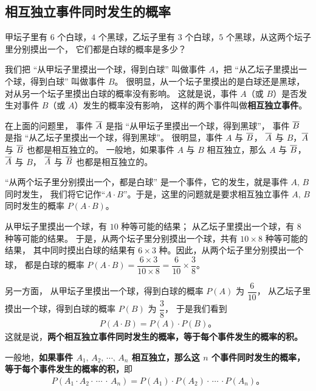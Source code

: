 \subsection{相互独立事件同时发生的概率}\label{subsec:3-4}

甲坛子里有 $6$ 个白球，$4$ 个黑球，乙坛子里有 $3$ 个白球，$5$ 个黑球，从这两个坛子里分别摸出一个，
它们都是白球的概率是多少？

我们把 “从甲坛子里摸出一个球，得到白球” 叫做事件 $A$，把 “从乙坛子里摸出一个球，得到白球” 叫做事件 $B$。
很明显，从一个坛子里摸出的是白球还是黑球，对从另一个坛子里摸出白球的概率没有影响。
这就是说，事件 $A$（或 $B$）是否发生对事件 $B$（或 $A$）发生的概率没有影响，
这样的两个事件叫做\textbf{相互独立事件}。

在上面的问题里，
事件 $\overline{A}$ 是指 “从甲坛子里摸出一个球，得到黑球”，
事件 $\overline{B}$ 是指 “从乙坛子里摸出一个球，得到黑球”。
很明显，事件 $A$ 与 $\overline{B}$， $\overline{A}$ 与 $B$，$\overline{A}$ 与 $\overline{B}$ 也都是相互独立的。
一般地，如果事件 $A$ 与 $B$ 相互独立，那么 $A$ 与 $\overline{B}$， $\overline{A}$ 与 $B$，
$\overline{A}$ 与 $\overline{B}$ 也都是相互独立的。

“从两个坛子里分别摸出一个，都是白球” 是一个事件，它的发生，就是事件 $A,\, B$ 同时发生，
我们将它记作“$A \cdot B$”。于是，这里的问题就是要求相互独立事件 $A,\, B$ 同时发生的概率 $P(A \cdot B)$。

从甲坛子里摸出一个球，有 $10$ 种等可能的结果；
从乙坛子里摸出一个球，有 $8$ 种等可能的结果。
于是，从两个坛子里分别摸出一个球，共有 $10 \times 8$ 种等可能的结果，
其中同时摸出白球的结果有 $6 \times 3$ 种。因此，从两个坛子里分别摸出一个球，
都是白球的概率 $P(A \cdot B) = \dfrac{6 \times 3}{10 \times 8} = \dfrac{6}{10} \times \dfrac{3}{8}$。

另一方面，
从甲坛子里摸出一个球，得到白球的概率 $P(A)$ 为 $\dfrac{6}{10}$，
从乙坛子里摸出一个球，得到白球的概率 $P(B)$ 为 $\dfrac{3}{8}$，
于是我们看到
\begin{align}
    \boxed{P(A \cdot B) = P(A) \cdot P(B) \text{。}}  \tag{3} \label{eq:du-li}
\end{align}
这就是说，\textbf{两个相互独立事件同时发生的概率，等于每个事件发生的概率的积。}

一般地，\textbf{如果事件 $A_1,\, A_2,\, \cdots,\, A_n$ 相互独立，那么这 $n$ 个事件同时发生的概率，
等于每个事件发生的概率的积，}即
\begin{align}
    P(A_1 \cdot A_2 \cdot \, \cdots \, \cdot \,  A_n) = P(A_1) \cdot P(A_2) \cdot \, \cdots \,  \cdot P(A_n) \text{。} \tag{$3'$} \label{eq:du-li-ex}
\end{align}


